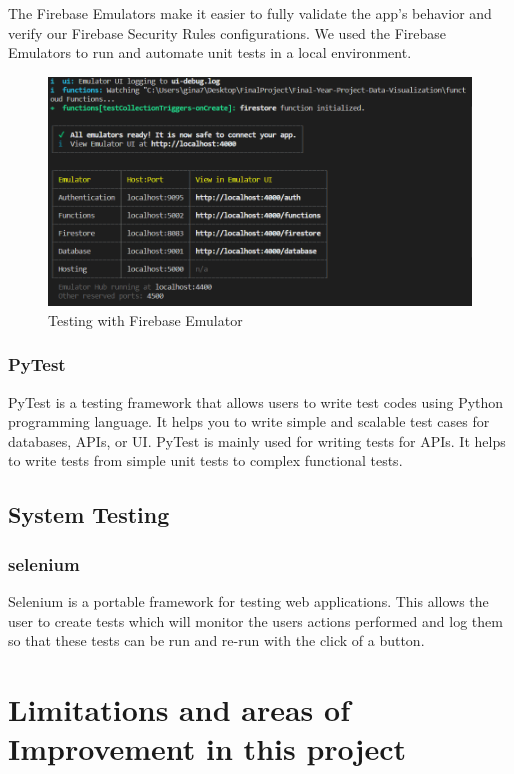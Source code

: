 The Firebase Emulators make it easier to fully validate the app's behavior and verify our Firebase Security Rules configurations.
We used the Firebase Emulators to run and automate unit tests in a local environment. 

\begin{figure}
    \centering
    \includegraphics[scale=0.6]{img/FirebaseEmulator.PNG}
    \caption{Testing with Firebase Emulator}
    \label{fig:my_label4}
\end{figure}


\subsubsection{PyTest}
PyTest is a testing framework that allows users to write test codes using Python programming language. It helps you to write simple and scalable test cases for databases, APIs, or UI. PyTest is mainly used for writing tests for APIs. It helps to write tests from simple unit tests to complex functional tests.

\subsection{System Testing}

\subsubsection{selenium}
Selenium is a portable framework for testing web applications. This allows the user to create tests which will monitor the users actions performed and log them so that these tests can be run and re-run with the click of a button.

\section{Limitations and areas of Improvement in this project}

